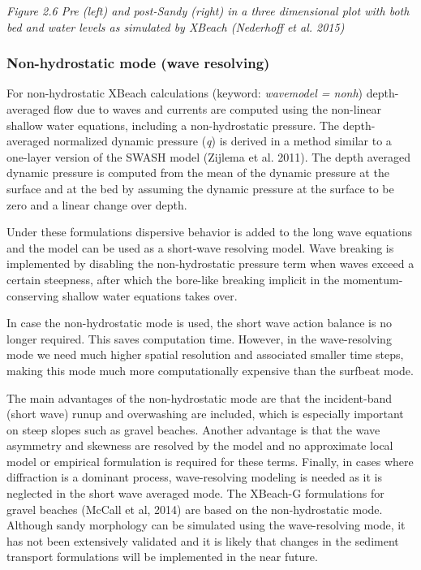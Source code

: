 \documentclass{article}
\begin{document}
\noindent 

\noindent \textit{Figure 2.6 Pre (left) and post-Sandy (right) in a three dimensional plot with both bed and water levels as simulated by XBeach (Nederhoff et al. 2015) }


\subsubsection{ Non-hydrostatic mode (wave resolving)  }

\noindent For non-hydrostatic XBeach calculations (keyword: \textit{wavemodel = nonh}) depth-averaged flow due to waves and currents are computed using the non-linear shallow water equations, including a non-hydrostatic pressure. The depth-averaged normalized dynamic pressure (\textit{q}) is derived in a method similar to a one-layer version of the SWASH model (Zijlema et al. 2011). The depth averaged dynamic pressure is computed from the mean of the dynamic pressure at the surface and at the bed by assuming the dynamic pressure at the surface to be zero and a linear change over depth. 

\noindent 

\noindent Under these formulations dispersive behavior is added to the long wave equations and the model can be used as a short-wave resolving model. Wave breaking is implemented by disabling the non-hydrostatic pressure term when waves exceed a certain steepness, after which the bore-like breaking implicit in the momentum-conserving shallow water equations takes over. 

\noindent 

\noindent In case the non-hydrostatic mode is used, the short wave action balance is no longer required. This saves computation time. However, in the wave-resolving mode we need much higher spatial resolution and associated smaller time steps, making this mode much more computationally expensive than the surfbeat mode. 

\noindent 

\noindent The main advantages of the non-hydrostatic mode are that the incident-band (short wave) runup and overwashing are included, which is especially important on steep slopes such as gravel beaches. Another advantage is that the wave asymmetry and skewness are resolved by the model and no approximate local model or empirical formulation is required for these terms. Finally, in cases where diffraction is a dominant process, wave-resolving modeling is needed as it is neglected in the short wave averaged mode. The XBeach-G formulations for gravel beaches (McCall et al, 2014) are based on the non-hydrostatic mode. Although sandy morphology can be simulated using the wave-resolving mode, it has not been extensively validated and it is likely that changes in the sediment transport formulations will be implemented in the near future.
\end{document}
